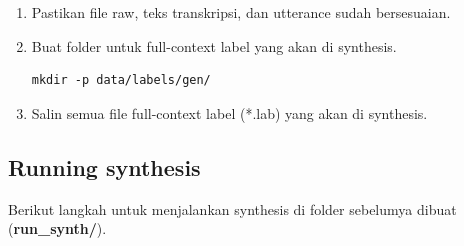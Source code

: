 \documentclass[12pt,]{article}
\begin{document}
\begin{enumerate}
		\item Pastikan file raw, teks transkripsi, dan utterance sudah bersesuaian.
		
		\item Buat folder untuk full-context label yang akan di synthesis.
		\begin{verbatim}
mkdir -p data/labels/gen/
		\end{verbatim}
		
		\item Salin semua file full-context label (*.lab) yang akan di synthesis.
		
	\end{enumerate}

	\newpage
	\subsection{Running synthesis}
	
	Berikut langkah untuk menjalankan synthesis di folder sebelumya dibuat (\textbf{run\_synth/}).
	
\end{document}
